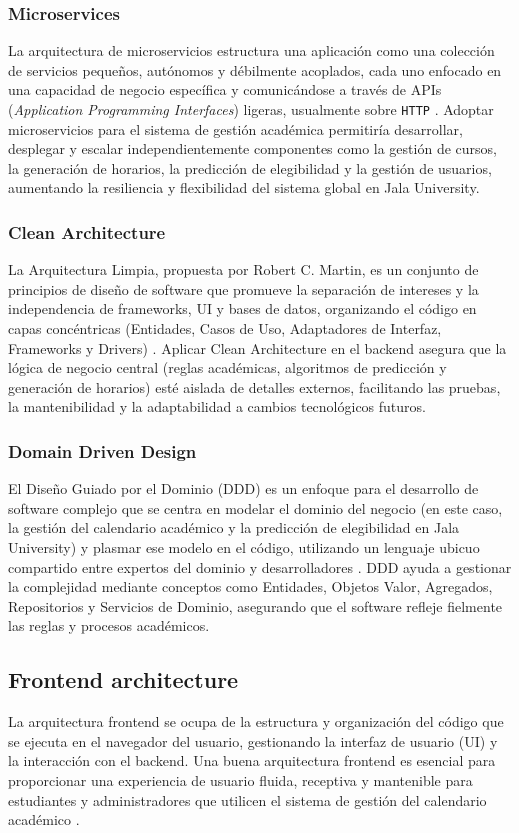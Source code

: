 \subsubsection{Microservices}
La arquitectura de microservicios estructura una aplicación como una colección de servicios pequeños, autónomos y débilmente acoplados, cada uno enfocado en una capacidad de negocio específica y comunicándose a través de APIs (\textit{Application Programming Interfaces}) ligeras, usualmente sobre \texttt{HTTP} \parencite{Newman2015}.
Adoptar microservicios para el sistema de gestión académica permitiría desarrollar, desplegar y escalar independientemente componentes como la gestión de cursos, la generación de horarios, la predicción de elegibilidad y la gestión de usuarios, aumentando la resiliencia y flexibilidad del sistema global en Jala University.

\subsubsection{Clean Architecture}
La Arquitectura Limpia, propuesta por Robert C.
Martin, es un conjunto de principios de diseño de software que promueve la separación de intereses y la independencia de frameworks, UI y bases de datos, organizando el código en capas concéntricas (Entidades, Casos de Uso, Adaptadores de Interfaz, Frameworks y Drivers) \parencite{Martin2017}. Aplicar Clean Architecture en el backend asegura que la lógica de negocio central (reglas académicas, algoritmos de predicción y generación de horarios) esté aislada de detalles externos, facilitando las pruebas, la mantenibilidad y la adaptabilidad a cambios tecnológicos futuros.

\subsubsection{Domain Driven Design}
El Diseño Guiado por el Dominio (DDD) es un enfoque para el desarrollo de software complejo que se centra en modelar el dominio del negocio (en este caso, la gestión del calendario académico y la predicción de elegibilidad en Jala University) y plasmar ese modelo en el código, utilizando un lenguaje ubicuo compartido entre expertos del dominio y desarrolladores \parencite{Evans2003}.
DDD ayuda a gestionar la complejidad mediante conceptos como Entidades, Objetos Valor, Agregados, Repositorios y Servicios de Dominio, asegurando que el software refleje fielmente las reglas y procesos académicos.

\subsection{Frontend architecture}
La arquitectura frontend se ocupa de la estructura y organización del código que se ejecuta en el navegador del usuario, gestionando la interfaz de usuario (UI) y la interacción con el backend.
Una buena arquitectura frontend es esencial para proporcionar una experiencia de usuario fluida, receptiva y mantenible para estudiantes y administradores que utilicen el sistema de gestión del calendario académico \parencite{Osmani2017}.

